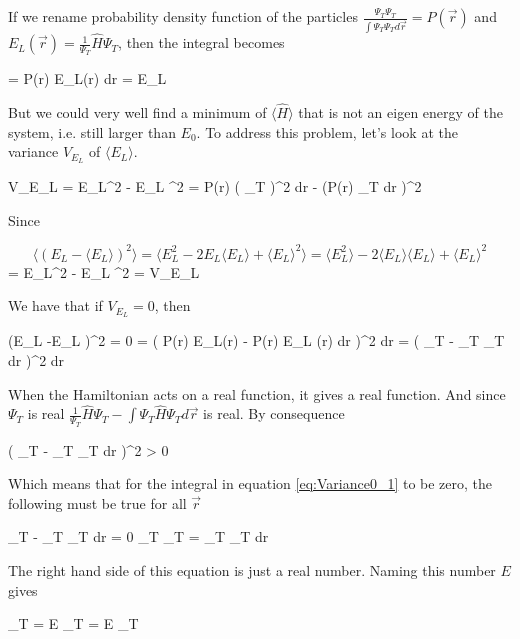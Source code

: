 If we rename probability density function of the particles $\frac{\Psi_T \Psi_T}{\int \Psi_T \Psi_T d\vec r} = P(\vec r)$ and $E_L(\vec r) = \frac{1}{\Psi_T} \hat{H} \Psi_T$, then the integral becomes 

\eqs
\langle {} \rangle = \int P(\vec r) E_L(\vec r) d\vec r = \langle E_L \rangle
\eqf

But we could very well find a minimum of $\langle \hat{H} \rangle$ that is not an eigen energy of the system, i.e. still larger than $E_0$.
To address this problem, let's look at the variance $V_{E_L}$ of $\langle E_L \rangle$. 

\eqs
V_{E_L} = \langle E_L^2 \rangle - \langle E_L \rangle^2
= 
\int P(\vec r) \left (  \Psi_T \right )^2 d\vec r -
\left (\int P(\vec r)   \Psi_T d\vec r \right )^2
\eqf 

Since

\[
\langle (E_L -\langle E_L \rangle)^2 \rangle = \langle E_L^2 - 2 E_L \langle E_L \rangle + \langle E_L \rangle^2 \rangle 
=  
\langle E_L^2 \rangle - 2 \langle E_L \rangle \langle E_L \rangle + \langle E_L \rangle^2
\]
\eqs
= \langle E_L^2 \rangle - \langle E_L \rangle^2 
=
V_{E_L}
\eqf

We have that if $V_{E_L} = 0$, then 

\eqs
\langle (E_L -\langle E_L \rangle)^2 \rangle = 0
\eqf
{} = \int  \left (  P(\vec r) E_L(\vec r) -  \int P(\vec r) E_L (\vec r) d\vec r \right )^2 d\vec r = 
\int \left (
  \Psi_T  - \int \Psi_T  \Psi_T d\vec r 
\right )^2 d\vec r
\label{eq:Variance0_1}
\eqf

When the Hamiltonian acts on a real function, it gives a real function. 
And since $\Psi_T$ is real $\frac{1}{\Psi_T} \hat{H} \Psi_T  - \int \Psi_T \hat{H} \Psi_T d\vec r$ is real. 
By consequence

\eqs 
\left (
  \Psi_T  - \int \Psi_T  \Psi_T d\vec r 
\right )^2 > 0
\eqf

Which means that for the integral in equation \ref{eq:Variance0_1} to be zero, the following must be true for all $\vec r$

\eqs
{}  \Psi_T  - \int \Psi_T  \Psi_T d\vec r  = 0
\eqf
\eqs
\Psi_T  \Psi_T = \int \Psi_T  \Psi_T d\vec r 
\eqf

The right hand side of this equation is just a real number. 
Naming this number $E$ gives 

\eqs
{}  \Psi_T = E 
\eqf
\eqs {}\Psi_T  = E \Psi_T  \eqf

